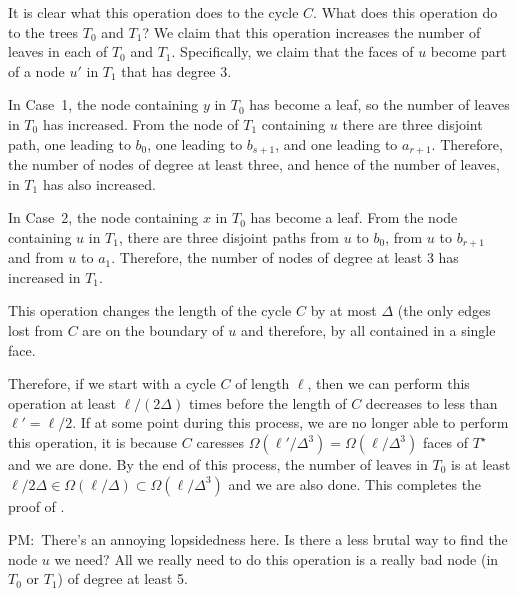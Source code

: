 \documentclass{patmorin}
\newcommand{\dual}[1]{{#1}^\star}
\newcommand{\note}[2]{{\color{red}#1:~#2}}
\begin{document}
It is clear what this operation does to the cycle $C$.  What does
this operation do to the trees $T_0$ and $T_1$?  We claim that this
operation increases the number of leaves in each of $T_0$ and $T_1$.
Specifically, we claim that the faces of $u$ become part of a node $u'$
in $T_1$ that has degree 3.

In Case~1, the node containing $y$ in $T_0$ has become a leaf, so
the number of leaves in $T_0$ has increased.  From the node of $T_1$
containing $u$ there are three disjoint path, one leading to $b_0$,
one leading to $b_{s+1}$, and one leading to $a_{r+1}$.  Therefore,
the number of nodes of degree at least three, and hence of the number
of leaves, in $T_1$ has also increased.

In Case~2, the node containing $x$ in $T_0$ has become a leaf.  From the
node containing $u$ in $T_1$, there are three disjoint paths from $u$
to $b_0$, from $u$ to $b_{r+1}$ and from $u$ to $a_1$.  Therefore,
the number of nodes of degree at least 3 has increased in $T_1$.

This operation changes the length of the cycle $C$ by at most $\Delta$
(the only edges lost from $C$ are on the boundary of $u$ and therefore,
by  all contained in a single face.

Therefore, if we start with a cycle $C$ of length $\ell$, then we can
perform this operation at least $\ell/(2\Delta)$ times before the length
of $C$ decreases to less than $\ell'=\ell/2$. If at some point during
this process, we are no longer able to perform this operation, it is because $C$ caresses $\Omega(\ell'/\Delta^3)=\Omega(\ell/\Delta^3)$ faces of $\dual{T}$ and we are done.  By the end of this process, the number of leaves in $T_0$ is at least $\ell/2\Delta\in\Omega(\ell/\Delta)\subset\Omega(\ell/\Delta^3)$ and we are also done.  This completes the proof of .

\note{PM}{There's an annoying lopsidedness here. Is there a less brutal way to find the node $u$ we need? All we really need to do this operation is a really bad node (in $T_0$ or $T_1$) of degree at least 5.}





\end{document}

